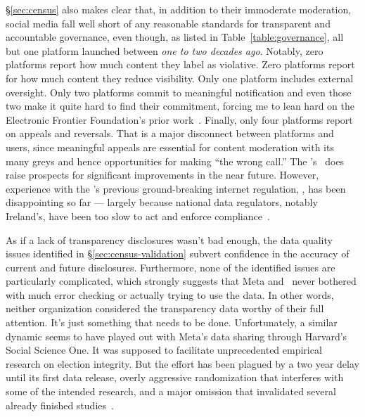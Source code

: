 


\S\ref{sec:census} also makes clear that, in addition to their immoderate
moderation, social media fall well short of any reasonable standards for
transparent and accountable governance, even though, as listed in
Table~\ref{table:governance}, all but one platform launched between \emph{one to
two decades ago}. Notably, zero platforms report how much content they label as
violative. Zero platforms report for how much content they reduce visibility.
Only one platform includes external oversight. Only two platforms commit to
meaningful notification and even those two make it quite hard to find their
commitment, forcing me to lean hard on the Electronic Frontier Foundation's
prior work~\cite{CrockerGebhartea2019}. Finally, only four platforms
report on appeals and reversals. That is a major disconnect between platforms
and users, since meaningful appeals are essential for content moderation with
its many greys and hence opportunities for making ``the wrong call.'' The \EU's
\DSA\ does raise prospects for significant improvements in the near future.
However, experience with the \EU's previous ground-breaking internet regulation,
\GDPR, has been disappointing so far --- largely because national data
regulators, notably Ireland's, have been too slow to act and enforce
compliance~\cite{Burgess2022}.

As if a lack of transparency disclosures wasn't bad enough, the data quality
issues identified in \S\ref{sec:census-validation} subvert confidence in the
accuracy of current and future disclosures. Furthermore, none of the identified
issues are particularly complicated, which strongly suggests that Meta and
\NCMEC\ never bothered with much error checking or actually trying to use the
data. In other words, neither organization considered the transparency data
worthy of their full attention. It's just something that needs to be done.
Unfortunately, a similar dynamic seems to have played out with Meta's data
sharing through Harvard's Social Science One. It was supposed to facilitate
unprecedented empirical research on election integrity. But the effort has been
plagued by a two year delay until its first data release, overly aggressive
randomization that interferes with some of the intended research, and a major
omission that invalidated several already finished
studies~\cite{Hegelich2020,HegelichMarcoea2020,Ingram2022,OHaraNelson2019,Timberg2021}.

